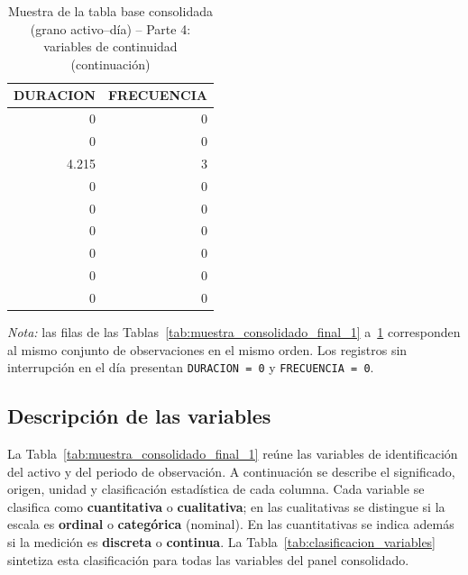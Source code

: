 \begin{table}[H]
\centering
\small
\caption{Muestra de la tabla base consolidada (grano activo--día) -- Parte 4: variables de continuidad (continuación)}
\label{tab:muestra_consolidado_final_4}
\begin{tabular}{r r}
\toprule
\textbf{DURACION} & \textbf{FRECUENCIA} \\
\midrule
0     & 0 \\
0     & 0 \\
4.215 & 3 \\
0     & 0 \\
0     & 0 \\
0     & 0 \\
0     & 0 \\
0     & 0 \\
0     & 0 \\
\bottomrule
\end{tabular}
\end{table}

\noindent\textit{Nota:} las filas de las Tablas~\ref{tab:muestra_consolidado_final_1} a~\ref{tab:muestra_consolidado_final_4} corresponden al mismo conjunto de observaciones en el mismo orden. Los registros sin interrupción en el día presentan \texttt{DURACION = 0} y \texttt{FRECUENCIA = 0}.

\subsection{Descripción de las variables}

La Tabla~\ref{tab:muestra_consolidado_final_1} reúne las variables de identificación del activo y del periodo de observación. A continuación se describe el significado, origen, unidad y clasificación estadística de cada columna. Cada variable se clasifica como \textbf{cuantitativa} o \textbf{cualitativa}; en las cualitativas se distingue si la escala es \textbf{ordinal} o \textbf{categórica} (nominal). En las cuantitativas se indica además si la medición es \textbf{discreta} o \textbf{continua}. La Tabla~\ref{tab:clasificacion_variables} sintetiza esta clasificación para todas las variables del panel consolidado.

